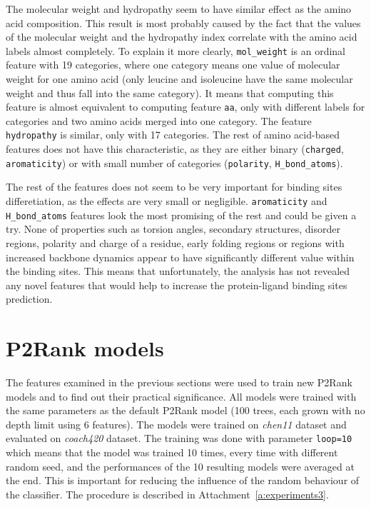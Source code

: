 The molecular weight and hydropathy seem to have similar effect as the amino acid composition. This result is most probably caused by the fact that the values of the molecular weight and the hydropathy index correlate with the amino acid labels almost completely. To explain it more clearly, \texttt{mol\_weight} is an ordinal feature with 19 categories, where one category means one value of molecular weight for one amino acid (only leucine and isoleucine have the same molecular weight and thus fall into the same category). It means that computing this feature is almost equivalent to computing feature \texttt{aa}, only with different labels for categories and two amino acids merged into one category. The feature \texttt{hydropathy} is similar, only with 17 categories. The rest of amino acid-based features does not have this characteristic, as they are either binary (\texttt{charged}, \texttt{aromaticity}) or with small number of categories (\texttt{polarity}, \texttt{H\_bond\_atoms}).

The rest of the features does not seem to be very important for binding sites differetiation, as the effects are very small or negligible. \texttt{aromaticity} and \texttt{H\_bond\_atoms} features look the most promising of the rest and could be given a try. None of properties such as torsion angles, secondary structures, disorder regions, polarity and charge of a residue, early folding regions or regions with increased backbone dynamics appear to have significantly different value within the binding sites. This means that unfortunately, the analysis has not revealed any novel features that would help to increase the protein-ligand binding sites prediction.

\newpage

\section{P2Rank models}

The features examined in the previous sections were used to train new P2Rank models and to find out their practical significance. All models were trained with the same parameters as the default P2Rank model (100 trees, each grown with no depth limit using 6 features). The models were trained on \textit{chen11} dataset and evaluated on \textit{coach420} dataset. The training was done with parameter \texttt{loop=10} which means that the model was trained 10 times, every time with different random seed, and the performances of the 10 resulting models were averaged at the end. This is important for reducing the influence of the random behaviour of the classifier. The procedure is described in Attachment~\ref{a:experiments3}.

